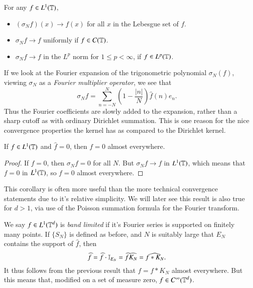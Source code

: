 \begin{theorem} For any $f \in L^1(\operatorname{\mathbb{T}})$,
    \begin{itemize}
        \item $(\sigma_N f)(x) \to f(x)$ for all $x$ in the Lebesgue set of $f$.
        \item $\sigma_N f \to f$ uniformly if $f \in C(\operatorname{\mathbb{T}})$.
        \item $\sigma_N f \to f$ in the $L^p$ norm for $1 \leq p < \infty$, if $f \in L^p(\operatorname{\mathbb{T}})$.
    \end{itemize}

\end{theorem}

If we look at the Fourier expansion of the trigonometric polynomial $\sigma_N(f)$, viewing $\sigma_N$ as a \emph{Fourier multiplier operator}, we see that
%
\[ \sigma_N f = \sum_{n = -N}^N \left( 1 - \frac{|n|}{N} \right) \widehat{f}(n) e_n. \]
%
Thus the Fourier coefficients are slowly added to the expansion, rather than a sharp cutoff as with ordinary Dirichlet summation. This is one reason for the nice convergence properties the kernel has as compared to the Dirichlet kernel.

\begin{corollary}
    If $f \in L^1(\operatorname{\mathbb{T}})$ and $\widehat{f} = 0$, then $f = 0$ almost everywhere.
\end{corollary}
\begin{proof}
    If $\widehat{f} = 0$, then $\sigma_N f = 0$ for all $N$. But $\sigma_N f \to f$ in $L^1(\operatorname{\mathbb{T}})$, which means that $f = 0$ in $L^1(\operatorname{\mathbb{T}})$, so $f = 0$ almost everywhere.
\end{proof}

This corollary is often more useful than the more technical convergence statements due to it's relative simplicity. We will later see this result is also true for $d > 1$, via use of the Poisson summation formula for the Fourier transform.

\begin{example}
    We say $f \in L^1(\operatorname{\mathbb{T}}^d)$ is \emph{band limited} if it's Fourier series is supported on finitely many points. If $\{ S_N \}$ is defined as before, and $N$ is suitably large that $E_N$ contains the support of $\widehat{f}$, then
    \[ \widehat{f} = \widehat{f} \cdot \operatorname{\mathbb{I}}_{E_N} = \widehat{f} \widehat{K_N} = \widehat{f * K_N}. \]
    It thus follows from the previous result that $f = f * K_N$ almost everywhere. But this means that, modified on a set of measure zero, $f \in C^\infty(\operatorname{\mathbb{T}}^d)$.
\end{example}

